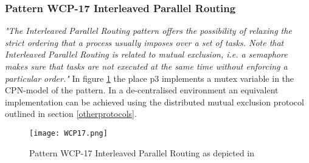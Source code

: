 \subsubsection{Pattern WCP-17 Interleaved Parallel Routing}
\emph{"The Interleaved Parallel Routing pattern offers the possibility of relaxing the strict ordering that a process usually imposes over a set of tasks. Note that Interleaved Parallel Routing is related to mutual exclusion, i.e. a semaphore makes sure that tasks are not executed at the same time without enforcing a particular order."} \cite{Russell2007} In figure \ref{fig:wcp17} the place p3 implements a mutex variable in the CPN-model of the pattern. In a de-centralised environment an equivalent implementation can be achieved using the distributed mutual exclusion protocol outlined in section \ref{otherprotocols}.

\begin{figure}[htbp]
\begin{center}
\texttt{[image: WCP17.png]}
\caption{Pattern WCP-17 Interleaved Parallel Routing as depicted in \cite{Russell2007}}
\label{fig:wcp17}
\end{center}
\end{figure}











